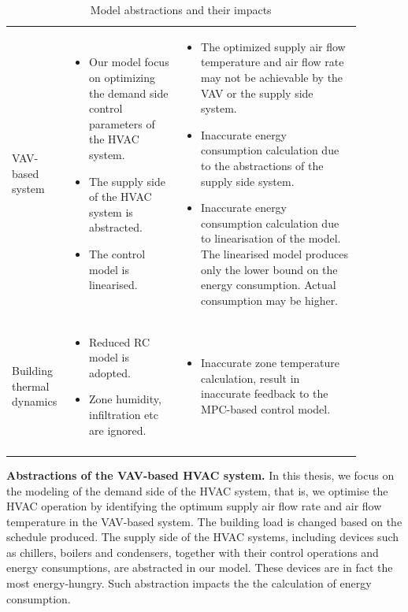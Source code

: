 \begin{table}[ht]
\centering
\small
\begin{tabular}{p{0.1\linewidth} p{0.30\linewidth} p{0.48\linewidth}  }
\hline \centering{\textbf{Model}} & \centering{\textbf{Abstractions}} & \centering{\textbf{Impacts}} \tabularnewline
\hline \vspace{1ex} VAV-based system & 
\begin{itemize}
	\item Our model focus on optimizing the demand side control parameters of the HVAC system.
	\item The supply side of the HVAC system is abstracted.
	\item The control model is linearised.
\end{itemize} & 
\begin{itemize}		
	\item The optimized supply air flow temperature and air flow rate may not be achievable by the VAV or the supply side system.
	\item Inaccurate energy consumption calculation due to the abstractions of the supply side system.
	\item Inaccurate energy consumption calculation due to linearisation of the model. The linearised model produces only the lower bound on the energy consumption. Actual consumption may be higher.
\end{itemize} 
\tabularnewline
\hline \vspace{1ex} Building thermal dynamics &
\begin{itemize}
	\item Reduced RC model is adopted.
	\item Zone humidity, infiltration etc are ignored.
\end{itemize}& 
\begin{itemize}
	\item Inaccurate zone temperature calculation, result in inaccurate feedback to the MPC-based control model.
\end{itemize}
 \tabularnewline
\tabularnewline
\end{tabular}
\normalsize
	\caption{Model abstractions and their impacts}
	\label{tab:impact}
\end{table}


\textbf{Abstractions of the VAV-based HVAC system.} In this thesis, we focus on the modeling of the demand side of the HVAC system, that is, we optimise the HVAC operation by identifying the optimum supply air flow rate and air flow temperature in the VAV-based system. The building load is changed based on the schedule produced. The supply side of the HVAC systems, including devices such as chillers, boilers and condensers, together with their control operations and energy consumptions, are abstracted in our model. These devices are in fact the most energy-hungry. Such abstraction impacts the the calculation of energy consumption. 

